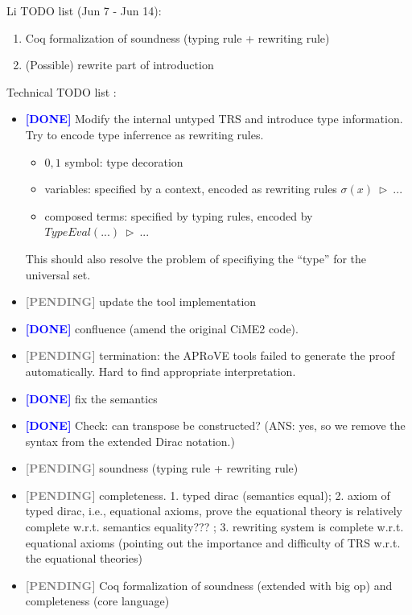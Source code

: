\documentclass[manuscript, review, timestamp]{acmart}
\newcommand*{\reduce}{\ \triangleright\ }
\newcommand*{\done}{\textcolor{blue}{\textbf{ [DONE] }}}
\newcommand*{\pending}{\textcolor{gray}{\textbf{ [PENDING] }}}
\begin{document}
Li TODO list (Jun 7 - Jun 14):
\begin{enumerate}
    \item Coq formalization of soundness (typing rule + rewriting rule)
    \item (Possible) rewrite part of introduction
\end{enumerate}


Technical TODO list :
\begin{itemize}
    \item \done Modify the internal untyped TRS and introduce type information. Try to encode type inferrence as rewriting rules.
        \begin{itemize}
            \item $0, 1$ symbol: type decoration
            \item variables: specified by a context, encoded as rewriting rules $\sigma(x) \reduce ...$
            \item composed terms: specified by typing rules, encoded by $TypeEval(...) \reduce ...$
        \end{itemize}
        This should also resolve the problem of specifiying the ``type'' for the universal set.
    \item \pending update the tool implementation
    \item \done confluence (amend the original CiME2 code).
    \item \pending termination: the APRoVE tools failed to generate the proof automatically. Hard to find appropriate interpretation. 
    \item \done fix the semantics
    \item \done Check: can transpose be constructed? (ANS: yes, so we remove the syntax from the extended Dirac notation.)
    \item \pending soundness (typing rule + rewriting rule)
    \item \pending completeness. 1. typed dirac (semantics equal); 2. axiom of typed dirac, i.e., equational axioms, prove the equational theory is relatively complete w.r.t. semantics equality??? ; 3. rewriting system is complete w.r.t. equational axioms (pointing out the importance and difficulty of TRS w.r.t. the equational theories)
    \item \pending Coq formalization of soundness (extended with big op) and completeness (core language)

\end{itemize}
\end{document}
